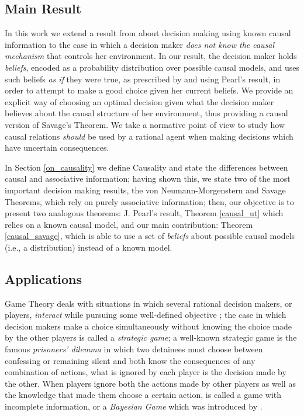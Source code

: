 \documentclass[review]{elsarticle}
\begin{document}
\subsection{Main Result}
In this work we extend a result from \cite{pearl2009causality} about decision making using known causal information to the case in which a decision maker \textit{does not know the causal mechanism} that controls her environment. In our result, the decision maker holds \textit{beliefs}, encoded as a probability distribution over possible causal models, and uses such beliefs \textit{as if} they were true, as prescribed by \cite{joyce1999foundations} and using Pearl's result, in order to attempt to make a good choice given her current beliefs. We provide an explicit way of choosing an optimal decision given what the decision maker believes about the causal structure of her environment, thus providing a causal version of Savage's Theorem. We take a normative point of view to study how causal relations \textit{should} be used by a rational agent when making decisions which have uncertain consequences. 

In Section \ref{on_causality} we define Causality and state the differences between causal and associative information; having shown this, we state two of the most important decision making results, the von Neumann-Morgenstern and Savage Theorems, which rely on purely associative information; then, our objective is to present two analogous theorems: J. Pearl's result, Theorem \ref{causal_ut} which relies on a known causal model, and our main contribution: Theorem \ref{causal_savage}, which is able to use a set of \textit{beliefs} about possible causal models (i.e., a distribution) instead of a known model.

\subsection{Applications}
Game Theory deals with situations in which several rational decision makers, or players, \textit{interact} while pursuing some well-defined objective \citep{osborne1994course}; the case in which decision makers make a choice simultaneously without knowing the choice made by the other players is called a \textit{strategic game}; a well-known strategic game is the famous \textit{prisoners' dilemma} in which two detainees must choose between confessing or remaining silent and both know the consequences of any combination of actions, what is ignored by each player is the decision made by the other. When players ignore both the actions made by other players as well as the knowledge that made them choose a certain action, is called a game with incomplete information, or a \textit{Bayesian Game} which was introduced by \cite{harsanyi1967games1,harsanyi1968games2,harsanyi1968games3}. 
\end{document}
